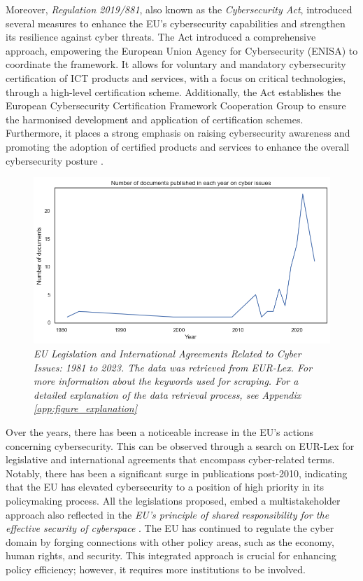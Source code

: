 Moreover, \textit{Regulation 2019/881}, also known as the \textit{Cybersecurity Act}, introduced several measures to enhance the EU's cybersecurity capabilities and strengthen its resilience against cyber threats. The Act introduced a comprehensive approach, empowering the European Union Agency for Cybersecurity (ENISA) to coordinate the framework. It allows for voluntary and mandatory cybersecurity certification of ICT products and services, with a focus on critical technologies, through a high-level certification scheme. Additionally, the Act establishes the European Cybersecurity Certification Framework Cooperation Group to ensure the harmonised development and application of certification schemes. Furthermore, it places a strong emphasis on raising cybersecurity awareness and promoting the adoption of certified products and services to enhance the overall cybersecurity posture \autocite{europeanparliament_2019_regulation}. 

\begin{figure}[H]
\centering
\includegraphics[width=1\textwidth]{Images/eurlex.png}
\caption{\textit{EU Legislation and International Agreements Related to Cyber Issues: 1981 to 2023. The data was retrieved from EUR-Lex. For more information about the keywords used for scraping. For a detailed explanation of the data retrieval process, see Appendix \ref{app:figure_explanation}}}
\label{eurlex.png}
\end{figure}

Over the years, there has been a noticeable increase in the EU's actions concerning cybersecurity. This can be observed through a search on EUR-Lex for legislative and international agreements that encompass cyber-related terms. Notably, there has been a significant surge in publications post-2010, indicating that the EU has elevated cybersecurity to a position of high priority in its policymaking process. All the legislations proposed, embed a multistakeholder approach also reflected in the \textit{EU’s principle of shared responsibility for the effective security of cyberspace} \autocite[6]{christou_2014_the}. The EU has continued to regulate the cyber domain by forging connections with other policy areas, such as the economy, human rights, and security. This integrated approach is crucial for enhancing policy efficiency; however, it requires more institutions to be involved.


